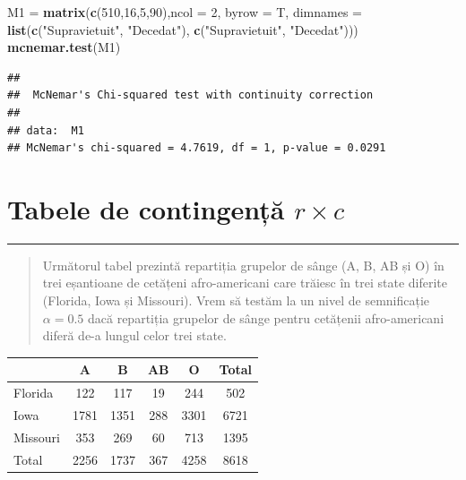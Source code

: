 \documentclass[]{article}
\newenvironment{Shaded}{\begin{snugshade}}{\end{snugshade}}
\newcommand{\KeywordTok}[1]{\textcolor[rgb]{0.13,0.29,0.53}{\textbf{{#1}}}}
\newcommand{\DataTypeTok}[1]{\textcolor[rgb]{0.13,0.29,0.53}{{#1}}}
\newcommand{\DecValTok}[1]{\textcolor[rgb]{0.00,0.00,0.81}{{#1}}}
\newcommand{\StringTok}[1]{\textcolor[rgb]{0.31,0.60,0.02}{{#1}}}
\newcommand{\NormalTok}[1]{{#1}}
\begin{document}
\begin{Shaded}
\begin{Highlighting}[]
\NormalTok{M1 =}\StringTok{ }\KeywordTok{matrix}\NormalTok{(}\KeywordTok{c}\NormalTok{(}\DecValTok{510}\NormalTok{,}\DecValTok{16}\NormalTok{,}\DecValTok{5}\NormalTok{,}\DecValTok{90}\NormalTok{),}\DataTypeTok{ncol =} \DecValTok{2}\NormalTok{, }\DataTypeTok{byrow =} \NormalTok{T, }
           \DataTypeTok{dimnames =} \KeywordTok{list}\NormalTok{(}\KeywordTok{c}\NormalTok{(}\StringTok{"Supravietuit"}\NormalTok{, }\StringTok{"Decedat"}\NormalTok{), }
                           \KeywordTok{c}\NormalTok{(}\StringTok{"Supravietuit"}\NormalTok{, }\StringTok{"Decedat"}\NormalTok{)))}
\KeywordTok{mcnemar.test}\NormalTok{(M1)}
\end{Highlighting}
\end{Shaded}

\begin{verbatim}
## 
##  McNemar's Chi-squared test with continuity correction
## 
## data:  M1
## McNemar's chi-squared = 4.7619, df = 1, p-value = 0.0291
\end{verbatim}

\section{\texorpdfstring{Tabele de contingență
\(r\times c\)}{Tabele de contingență r\textbackslash{}times c}}\label{tabele-de-contingenta-rtimes-c}

\begin{center}\rule{0.5\linewidth}{\linethickness}\end{center}

\begin{quote}
Următorul tabel prezintă repartiția grupelor de sânge (A, B, AB și O) în
trei eșantioane de cetățeni afro-americani care trăiesc în trei state
diferite (Florida, Iowa și Missouri). Vrem să testăm la un nivel de
semnificație \(\alpha = 0.5\) dacă repartiția grupelor de sânge pentru
cetățenii afro-americani diferă de-a lungul celor trei state.
\end{quote}

\begin{longtable}[]{@{}lccccc@{}}
\toprule
& A & B & AB & O & Total\tabularnewline
\midrule
\endhead
Florida & 122 & 117 & 19 & 244 & 502\tabularnewline
Iowa & 1781 & 1351 & 288 & 3301 & 6721\tabularnewline
Missouri & 353 & 269 & 60 & 713 & 1395\tabularnewline
Total & 2256 & 1737 & 367 & 4258 & 8618\tabularnewline
\bottomrule
\end{longtable}
\end{document}
